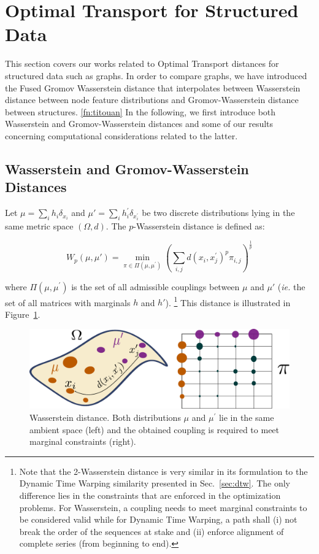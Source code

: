 \section{Optimal Transport for Structured Data}
\label{sec:ot}

This section covers our works related to Optimal Transport distances for
structured data such as graphs.
In order to compare graphs, we have introduced the Fused Gromov Wasserstein
distance that interpolates between Wasserstein distance between node feature
distributions and Gromov-Wasserstein distance between structures.%
\cref{fn:titouan}
In the following, we first introduce both Wasserstein and Gromov-Wasserstein
distances and
some of our results concerning computational considerations related to the
latter.

\subsection{Wasserstein and Gromov-Wasserstein Distances}

Let $\mu = \sum_i h_i \delta_{x_i}$ and $\mu' = \sum_i h^\prime_i \delta_{x^\prime_i}$
be two
discrete distributions lying in the same metric space $(\Omega, d)$.
The $p$-Wasserstein distance is defined as:

\begin{equation}
    W_p(\mu, \mu') = \min_{\pi \in \Pi(\mu, \mu^\prime)}
        \left(\sum_{i,j} d(x_i, x^\prime_j)^p \pi_{i,j} \right)^{\frac{1}{p}}
    \label{eq:wass}
\end{equation}

where $\Pi(\mu, \mu^\prime)$ is the set of all admissible couplings between
$\mu$ and $\mu'$ (\emph{ie.} the set of all matrices with marginals $h$ and $h'$).%
\footnote{Note that the 2-Wasserstein distance is very similar in its formulation to
the Dynamic Time Warping similarity presented in Sec.~\ref{sec:dtw}.
The only difference lies in the constraints that are enforced in the
optimization problems.
For Wasserstein, a coupling needs to meet marginal constraints to be considered
valid while for Dynamic Time Warping, a path shall (i) not break the order of
the sequences at stake and (ii) enforce alignment of complete series (from
beginning to end).}
This distance is illustrated in Figure~\ref{fig:wass}.

\begin{figure}
\centering
\includegraphics[width=.6\textwidth]{fig/wass}
\caption{Wasserstein distance. Both distributions $\mu$ and $\mu^\prime$ lie
in the same ambient space (left) and the obtained coupling is required to meet
marginal constraints (right).\label{fig:wass}}
\end{figure}

